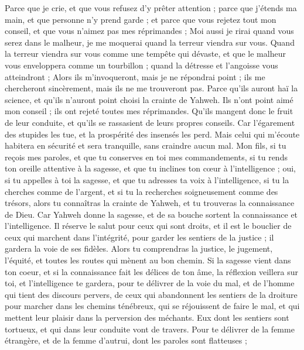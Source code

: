 \begin{multicols}{2}
Parce que je crie, et que vous refusez d’y prêter attention ; parce que j’étends ma main, et que personne n’y prend garde ;
et parce que vous rejetez tout mon conseil, et que vous n’aimez pas mes réprimandes ;
Moi aussi je rirai quand vous serez dans le malheur, je me moquerai quand la terreur viendra sur vous.
Quand la terreur viendra sur vous comme une tempête qui dévaste, et que le malheur vous enveloppera comme un tourbillon ; quand la détresse et l'angoisse vous atteindront ;
Alors ils m’invoqueront, mais je ne répondrai point ; ils me chercheront sincèrement, mais ils ne me trouveront pas.
Parce qu'ils auront haï la science, et qu'ils n'auront point choisi la crainte de Yahweh.
Ils n'ont point aimé mon conseil ; ils ont rejeté toutes mes réprimandes.
Qu'ils mangent donc le fruit de leur conduite, et qu'ils se rassasient de leurs propres conseils.
Car l’égarement des stupides les tue, et la prospérité des insensés les perd.
Mais celui qui m'écoute habitera en sécurité et sera tranquille, sans craindre aucun mal.
\VerseOne{}Mon fils, si tu reçois mes paroles, et que tu conserves en toi mes commandements,
si tu rends ton oreille attentive à la sagesse, et que tu inclines ton cœur à l'intelligence ;
oui, si tu appelles à toi la sagesse, et que tu adresses ta voix à l'intelligence,
si tu la cherches comme de l'argent, et si tu la recherches soigneusement comme des trésors,
alors tu connaîtras la crainte de Yahweh, et tu trouveras la connaissance de Dieu.
Car Yahweh donne la sagesse, et de sa bouche sortent la connaissance et l'intelligence.
Il réserve le salut pour ceux qui sont droits, et il est le bouclier de ceux qui marchent dans l'intégrité,
pour garder les sentiers de la justice ; il gardera la voie de ses fidèles.
Alors tu comprendras la justice, le jugement, l'équité, et toutes les routes qui mènent au bon chemin.
Si la sagesse vient dans ton coeur, et si la connaissance fait les délices de ton âme,
la réflexion veillera sur toi, et l'intelligence te gardera,
pour te délivrer de la voie du mal, et de l'homme qui tient des discours pervers,
de ceux qui abandonnent les sentiers de la droiture pour marcher dans les chemins ténébreux,
qui se réjouissent de faire le mal, et qui mettent leur plaisir dans la perversion des méchants.
Eux dont les sentiers sont tortueux, et qui dans leur conduite vont de travers.
Pour te délivrer de la femme étrangère, et de la femme d'autrui, dont les paroles sont flatteuses ;

\end{multicols}
